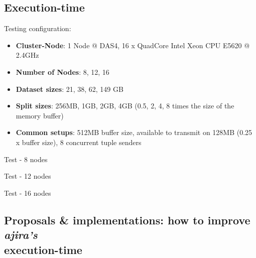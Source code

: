 \pagebreak

% 
\subsection{Execution-time}

Testing configuration: 
\begin{itemize}
	\item \textbf{Cluster-Node}: 1 Node @ DAS4, 16 x QuadCore Intel Xeon CPU E5620 @ 2.4GHz 
	\item \textbf{Number of Nodes}: 8, 12, 16
	\item \textbf{Dataset sizes}: 21, 38, 62, 149 GB
	\item \textbf{Split sizes}: 256MB, 1GB, 2GB, 4GB (0.5, 2, 4, 8 times the size of the memory buffer)
	\item \textbf{Common setups}: 512MB buffer size, available to transmit on 128MB (0.25 x buffer size), 8 concurrent tuple senders
\end{itemize}

Test - 8 nodes
\newline \newline
\renewcommand{\arraystretch}{1.2}
{\footnotesize\tt

}

Test - 12 nodes
\newline \newline
\renewcommand{\arraystretch}{1.2}
{\footnotesize\tt

}

Test - 16 nodes
\newline \newline
\renewcommand{\arraystretch}{1.2}
{\footnotesize\tt

}

% 
\subsection{Proposals \& implementations: how to improve \textit{ajira's} \\ execution-time}

